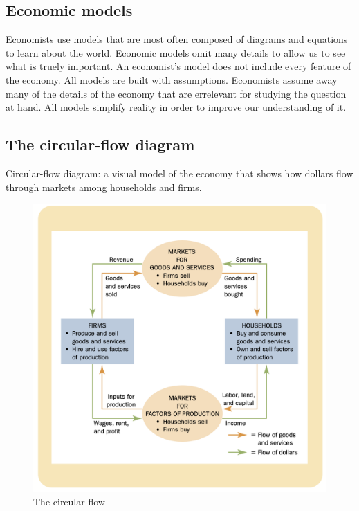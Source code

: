 \subsection{Economic models}

Economists use models that are most often composed of diagrams and equations to learn about the world.
Economic models omit many details to allow us to see what is truely important.
An economist's model does not include every feature of the economy.
All models are built with assumptions.
Economists assume away many of the details of the economy that are errelevant for studying the question at hand.
All models simplify reality in order to improve our understanding of it.

\subsection{The circular-flow diagram}

Circular-flow diagram: a visual model of the economy that shows how dollars flow through markets among households and firms.


\begin{figure}[!ht]
  \centering
  \includegraphics[width=\textwidth]{pics/circular-flow.png}
  \caption{The circular flow}
  \label{fig:circular-flow}
\end{figure}


